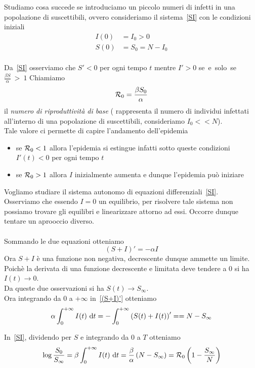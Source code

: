 Studiamo cosa succede se introduciamo un piccolo numeri di infetti in una popolazione di suscettibili, ovvero consideriamo il sistema~\ref{SI} con le condizioni iniziali
\begin{equation*}
\begin{aligned}
  I(0)&=I_0>0 \\
  S(0)&=S_0= N-I_0 \end{aligned}
\end{equation*}\\ Da~\ref{SI} osserviamo che $S'<0$ per ogni tempo $t$ mentre $I'>0$ se~e~solo~se~$\frac{\beta S }{\alpha}~>~1 $
Chiamiamo  
$$ \mathcal R_0  = \frac{\beta S_0 }{\alpha}$$ 
il \textit{ numero  di riproduttivit\`a di base} ( rappresenta il numero di individui infettati all'interno di una popolazione di suscettibili, consideriamo $I_0<<N$).\\
Tale valore ci permette di capire l'andamento dell'epidemia
\begin{itemize}
	\item se $\mathcal R_0<1$ allora l'epidemia si estingue infatti sotto queste condizioni $I'(t)<0$ per ogni tempo $t$ 
	\item se $\mathcal R_0>1$ allora $I$ inizialmente aumenta e dunque l'epidemia pu\`o iniziare
\end{itemize}
Vogliamo studiare il sistema autonomo di equazioni differenziali~\ref{SI}.\\
Osserviamo che essendo $I=0$ un equilibrio, per risolvere tale sistema non possiamo trovare gli equilibri e linearizzare attorno ad essi. Occorre dunque tentare un aprooccio diverso.\\ \\
Sommando le due equazioni otteniamo 
\begin{equation}
	\label{(S+I)'}(S+I)' = -\alpha I
\end{equation}
Ora $S+I$ \`e una funzione non negativa, decrescente dunque ammette un limite.\\
Poich\`e la derivata di una funzione decrescente e limitata deve tendere a $0$ si ha $I(t)\to 0 $.
\\
Da queste due osservazioni si ha $S(t) \to S_\infty$.\\
Ora integrando da $0$ a $+\infty$ in~\ref{(S+I)'} otteniamo 
$$ \alpha \int_0^{+\infty} I(t) \,\,\mathrm{d} t = -\int_0^{+\infty} \left(  S(t) + I(t) \right)' == N -S_\infty$$ 

In~\ref{SI}, dividendo per $S$ e integrando da $0$ a $T$ otteniamo 
\begin{equation}\label{rel_finale} \log \frac{S_0}{S_\infty} = \beta \int_0^{+\infty} I(t) \,\,\mathrm{d} t =  \frac{\beta}{\alpha} \left(  N - S_\infty  \right)= \mathcal R_0 \left(  1 - \frac{S_\infty}{N} \right)
\end{equation}

